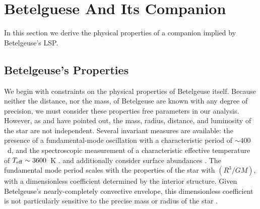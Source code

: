 \documentclass[twocolumn]{aastex631}
\begin{document}
\section{Betelguese And Its Companion}\label{sec:LF}


In this section we derive the physical properties of a companion implied by Betelgeuse's LSP.

\subsection{Betelgeuse's Properties}\label{sec:BGprop}

We begin with constraints on the physical properties of Betelgeuse itself. Because neither the distance, nor the mass, of Betelgeuse are known with any degree of precision, we must consider these properties free parameters in our analysis. However, as \citet{2016ApJ...819....7D} and \citet{2020ApJ...902...63J} have pointed out, the mass, radius, distance, and luminosity of the star are not independent. Several invariant measures are available: the presence of a fundamental-mode oscillation with a characteristic period of $\sim 400$~d, and the spectroscopic measurement of a characteristic effective temperature of $T_{\rm eff}\sim 3600$~K \citep{2020ApJ...902...63J,2020ApJ...891L..37L,2020ApJ...905...34H}. \citet{2016ApJ...819....7D} and \citet{2022ApJ...927..115L} additionally consider surface abundances \citep[reviewed by][]{2023A&G....64.3.11W}. The fundamental mode period scales with the properties of the star with $(R^3 / GM)$, with a dimensionless coefficient determined by the interior structure. Given Betelgeuse's nearly-completely convective envelope, this dimensionless coefficient is not particularly sensitive to the precise mass or radius of the star \citep[e.g.][]{2020ApJ...902...63J,2023ApJ...956...27M}. 
\end{document}

